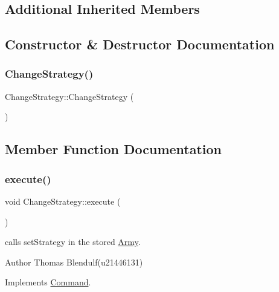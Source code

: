 \subsection*{Additional Inherited Members}


\subsection{Constructor \& Destructor Documentation}
\mbox{\label{class_change_strategy_a4a3aa694854f3de1ed0f63835ac1c4ab}} 
\subsubsection{\texorpdfstring{ChangeStrategy()}{ChangeStrategy()}}
{\footnotesize\ttfamily Change\+Strategy\+::\+Change\+Strategy (\begin{DoxyParamCaption}{ }\end{DoxyParamCaption})}



\subsection{Member Function Documentation}
\mbox{\label{class_change_strategy_a3d93f81a8f2a98a978120eaaff18aecd}} 
\subsubsection{\texorpdfstring{execute()}{execute()}}
{\footnotesize\ttfamily void Change\+Strategy\+::execute (\begin{DoxyParamCaption}{ }\end{DoxyParamCaption})\hspace{0.3cm}{\ttfamily [virtual]}}



calls set\+Strategy in the stored \mbox{\hyperlink{class_army}{Army}}. 

\begin{DoxyAuthor}{Author}
Thomas Blendulf(u21446131) 
\end{DoxyAuthor}


Implements \mbox{\hyperlink{class_command_a6fd7d9bd8df8bfc881e4d6c7cd1878b7}{Command}}.

